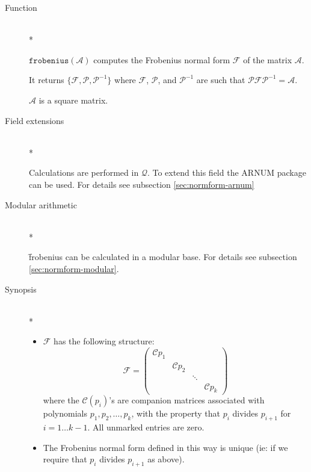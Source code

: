 \begin{description}
\item[Function]\mbox{}\\*

$\mathtt{frobenius}(\mathcal{A})$ computes the Frobenius normal form 
$\mathcal{F}$ of the matrix $\mathcal{A}$.

It returns $\{\mathcal{F}, \mathcal{P}, \mathcal{P}^{-1}\}$ where $\mathcal{F}$, 
$\mathcal{P}$, and $\mathcal{P}^{-1}$ are such that $\mathcal{P F P}^{-1} = 
\mathcal{A}$.

$\mathcal{A}$ is a square matrix.

\item[Field extensions]\mbox{}\\*

Calculations are performed in $\mathcal{Q}$. To extend this field the 
{\small ARNUM} package can be used. For details see subsection \ref{sec:normform-arnum}

\item[Modular arithmetic]\mbox{}\\*

\f{frobenius} can be calculated in a modular base. For details see 
subsection \ref{sec:normform-modular}.

\item[Synopsis]\mbox{}\\*

\begin{itemize}
\item $\mathcal{F}$ has the following structure:
      \begin{displaymath}
      \mathcal{F} = \begin{pmatrix} \mathcal{C}{p_{1}} &  &  & 
      \\  & \mathcal{C}{p_{2}} &  &  \\  &  & \ddots &  \\  &  &  & 
      \mathcal{C}{p_{k}} \end{pmatrix} 
      \end{displaymath}
      where the $\mathcal{C}({p_{i}})$'s are companion matrices 
      associated with polynomials $p_{1}, p_{2},\ldots, p_{k}$, 
      with the property that $p_{i}$ divides 
      $p_{i+1}$ for $i =1\ldots k-1$. All unmarked entries are 
      zero.

\item The Frobenius normal form defined in this way is unique (ie: if 
      we require that $p_{i}$ divides $p_{i+1}$ as above).
\end{itemize}
 

\end{description}
